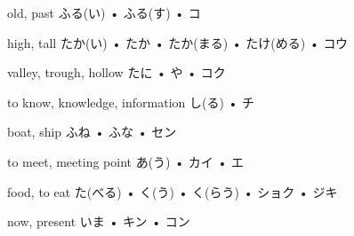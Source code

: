 



\setcounter{cardnum}{105}

		{old, past}
		{ふる(い) • ふる(す) • コ}
		{}{}
		{}{}
		{}{}
		{}{}
		{}{}

		{high, tall}
		{たか(い) • たか • たか(まる) • たけ(める) • コウ}
		{}{}
		{}{}
		{}{}
		{}{}
		{}{}

		{valley, trough, hollow}
		{たに • や • コク}
		{}{}
		{}{}
		{}{}
		{}{}
		{}{}

		{to know, knowledge, information}
		{し(る) • チ}
		{}{}
		{}{}
		{}{}
		{}{}
		{}{}

		{boat, ship}
		{ふね • ふな • セン}
		{}{}
		{}{}
		{}{}
		{}{}
		{}{}

		{to meet, meeting point}
		{あ(う) • カイ • エ}
		{}{}
		{}{}
		{}{}
		{}{}
		{}{}

		{food, to eat}
		{た(べる) • く(う) • く(らう) • ショク • ジキ}
		{}{}
		{}{}
		{}{}
		{}{}
		{}{}

		{now, present}
		{いま • キン • コン}
		{}{}
		{}{}
		{}{}
		{}{}
		{}{}

